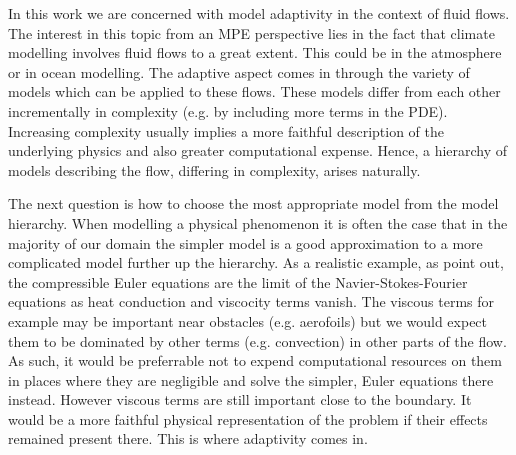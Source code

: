 \documentclass[12pt,a4paper]{article}
\theoremstyle{definition}
\begin{document}
In this work we are concerned with model adaptivity in the context of fluid flows.  The interest in this topic from an MPE perspective lies in the fact that climate modelling involves fluid flows to a great extent.  This could be in the atmosphere or in ocean modelling.  The adaptive aspect comes in through the variety of models which can be applied to these flows. These models differ from each other incrementally in complexity (e.g. by including more terms in the PDE).  Increasing complexity  usually implies a more faithful description of the underlying physics and also greater computational expense. Hence, a hierarchy of models describing the flow, differing in complexity, arises naturally.

The next question is how to choose  the most appropriate model from the model hierarchy. When modelling a physical phenomenon it is often the case that in the majority of our domain the simpler model is a good approximation to a more complicated model further up the hierarchy.  As a realistic example, as \cite{giesselmann2017posteriori} point out, the compressible Euler equations are the limit of the Navier-Stokes-Fourier equations as heat conduction and viscocity terms vanish.    The viscous terms for example may be important near obstacles (e.g. aerofoils) but we would expect them to be dominated by other terms (e.g. convection) in other parts of the flow.  As such, it would be preferrable not to expend computational resources on them in places where they are negligible and solve the simpler, Euler equations there instead.  However viscous terms are still important close to the boundary.  It would be a more faithful physical representation of the problem if their effects remained present there.  This is where adaptivity comes in.  
\end{document}
